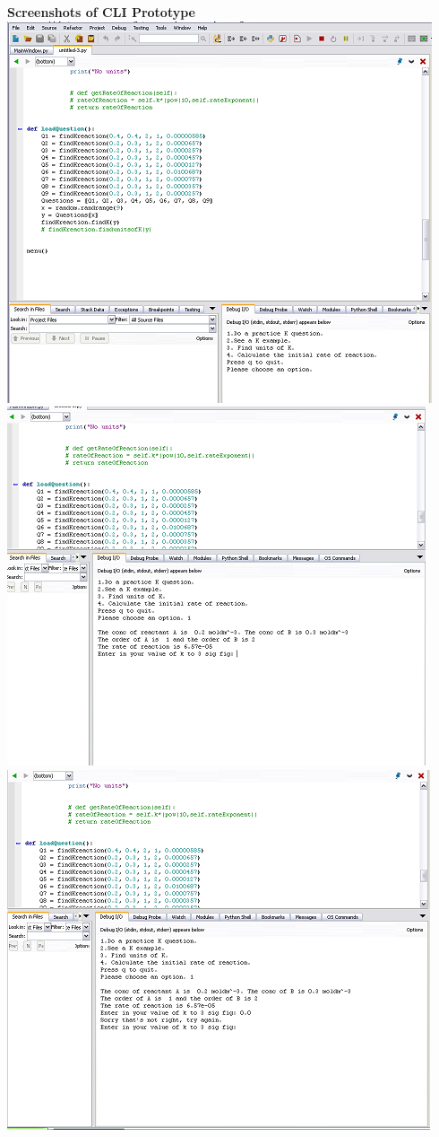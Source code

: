 \documentclass[a4paper,12pt]{report}
\begin{document}
\clearpage
\textbf{Screenshots of CLI Prototype}\\
\includegraphics{CLI01}\\
\includegraphics{CLI02}\\
\includegraphics{CLI03}\\
\end{document}
